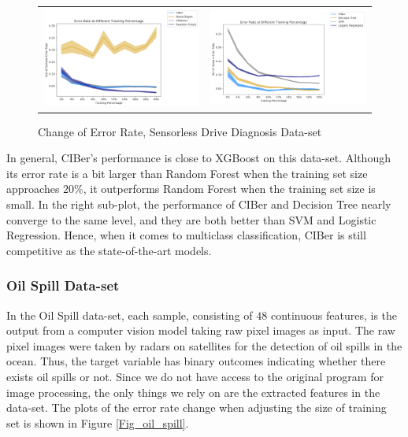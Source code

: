 \documentclass[twoside,11pt]{article}
\begin{document}
\begin{figure}[h]
\begin{tabular}{ll}
\includegraphics[width=0.5\linewidth]{Figures/Empirical/err_change_sensorless_1.png}
&
\includegraphics[width=0.5\linewidth]{Figures/Empirical/err_change_sensorless_2.png}
\end{tabular}
\caption{Change of Error Rate, Sensorless Drive Diagnosis Data-set}
\label{Fig_sensorless}
\end{figure}

In general, CIBer's performance is close to XGBoost on this data-set. Although its error rate is a bit larger than Random Forest when the training set size approaches $20\%$, it outperforms Random Forest when the training set size is small. In the right sub-plot, the performance of CIBer and Decision Tree nearly converge to the same level, and they are both better than SVM and Logistic Regression. Hence, when it comes to multiclass classification, CIBer is still competitive as the state-of-the-art models.  

\subsubsection{Oil Spill Data-set}
In the Oil Spill data-set, each sample, consisting of $48$ continuous features, is the output from a computer vision model taking raw pixel images as input. The raw pixel images were taken by radars on satellites for the detection of oil spills in the ocean. Thus, the target variable has binary outcomes indicating whether there exists oil spills or not. Since we do not have access to the original program for image processing, the only things we rely on are the extracted features in the data-set. The plots of the error rate change when adjusting the size of training set is shown in Figure \ref{Fig_oil_spill}.
\end{document}
